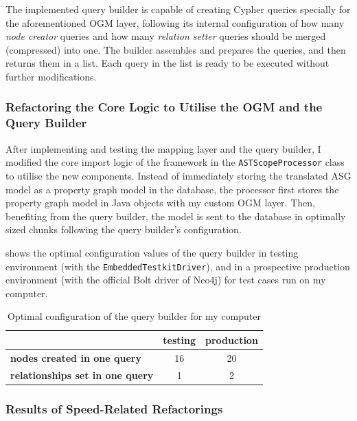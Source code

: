 The implemented query builder is capable of creating Cypher queries specially for the aforementioned OGM layer, following its internal configuration of how many \emph{node creator} queries and how many \emph{relation setter} queries should be merged (compressed) into one. The builder assembles and prepares the queries, and then returns them in a list. Each query in the list is ready to be executed without further modifications.


\subsubsection{Refactoring the Core Logic to Utilise the OGM and the Query Builder}

After implementing and testing the mapping layer and the query builder, I modified the core import logic of the framework in the \lstinline{ASTScopeProcessor} class to utilise the new components. Instead of immediately storing the translated ASG model as a property graph model in the database, the processor first stores the property graph model in Java objects with my custom OGM layer. Then, benefiting from the query builder, the model is sent to the database in optimally sized chunks following the query builder's configuration.

 shows the optimal configuration values of the query builder in testing environment (with the \lstinline{EmbeddedTestkitDriver}), and in a prospective production environment (with the official Bolt driver of Neo4j) for test cases run on my computer.

\begin{table}[!htb]
	\centering
	\begin{tabular}{l|cc}
		\toprule
																								&   \textbf{testing}   &   \textbf{production}   \\
		\midrule
		\textbf{nodes created in one query}         &   16                 &   20                    \\
		\textbf{relationships set in one query}     &   1                  &   2                     \\
		\bottomrule
	\end{tabular}

	\caption{Optimal configuration of the query builder for my computer}
	\label{table:query-builder-config}
\end{table}


\subsubsection{Results of Speed-Related Refactorings}

